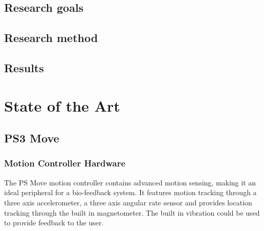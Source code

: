 \documentclass[11pt,twoside,a4paper]{report}
\begin{document}
\section{Research goals}

\section{Research method}

\section{Results}


\chapter{State of the Art}

\section{PS3 Move}

\subsection{Motion Controller Hardware}
The PS Move motion controller contains advanced motion sensing, making it an ideal peripheral for a bio-feedback system. It features motion tracking through a three axis accelerometer, a three axis angular rate sensor and provides location tracking through the built in magnetometer. The built in vibration could be used to provide feedback to the user. %
\end{document}
